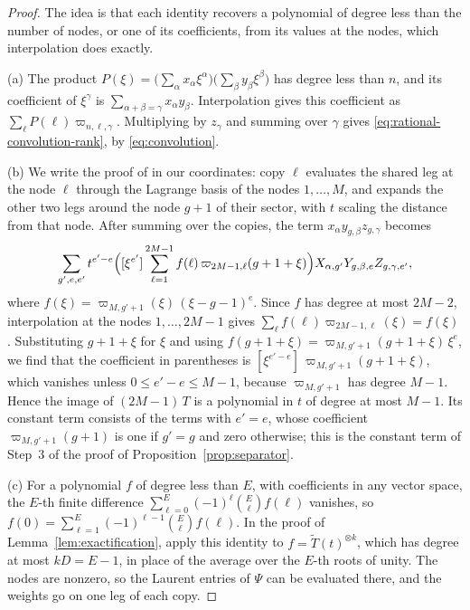 \begin{proof}
The idea is that each identity recovers a polynomial of degree less
than the number of nodes, or one of its coefficients, from its values at
the nodes, which interpolation does exactly.

(a) The product
\(P(\xi)=\bigl(\sum_\alpha x_\alpha\xi^\alpha\bigr)
\bigl(\sum_\beta y_\beta\xi^\beta\bigr)\) has degree less than \(n\),
and its coefficient of \(\xi^\gamma\) is
\(\sum_{\alpha+\beta=\gamma}x_\alpha y_\beta\). Interpolation gives this
coefficient as \(\sum_\ell P(\ell)\varpi_{n,\ell,\gamma}\). Multiplying by
\(z_\gamma\) and summing over \(\gamma\) gives
\eqref{eq:rational-convolution-rank}, by \eqref{eq:convolution}.

(b) We write the proof of \citet{Lu26} in our coordinates: copy
\(\ell\) evaluates the shared leg at the node \(\ell\) through the
Lagrange basis of the nodes \(1,\ldots,M\), and expands the other two
legs around the node \(g+1\) of their sector, with \(t\) scaling the
distance from that node. After summing over the copies, the term
\(x_\alpha y_{g,\beta}z_{g,\gamma}\) becomes
\[
 \sum_{g',e,e'}t^{e'-e}\Bigl([\xi^{e'}]\sum_{\ell=1}^{2M-1}f(\ell)\,
 \varpi_{2M-1,\ell}(g+1+\xi)\Bigr)X_{\alpha,g'}Y_{g,\beta,e}Z_{g,\gamma,e'},
\]
where \(f(\xi)=\varpi_{M,g'+1}(\xi)\,(\xi-g-1)^e\). Since \(f\) has
degree at most \(2M-2\), interpolation at the nodes \(1,\ldots,2M-1\)
gives \(\sum_\ell f(\ell)\varpi_{2M-1,\ell}(\xi)=f(\xi)\). Substituting
\(g+1+\xi\) for \(\xi\) and using
\(f(g+1+\xi)=\varpi_{M,g'+1}(g+1+\xi)\,\xi^e\), we find that the
coefficient in parentheses is \([\xi^{e'-e}]\,\varpi_{M,g'+1}(g+1+\xi)\),
which vanishes unless \(0\le e'-e\le M-1\), because \(\varpi_{M,g'+1}\)
has degree \(M-1\). Hence the image of \((2M-1)\,T\) is a polynomial in
\(t\) of degree at most \(M-1\). Its constant term consists of the terms
with \(e'=e\), whose coefficient \(\varpi_{M,g'+1}(g+1)\) is one if
\(g'=g\) and zero otherwise; this is the constant term of Step~3 of the
proof of Proposition~\ref{prop:separator}.

(c) For a polynomial \(f\) of degree less than \(E\), with coefficients
in any vector space, the \(E\)-th finite difference
\(\sum_{\ell=0}^E(-1)^\ell\binom E\ell f(\ell)\) vanishes, so
\(f(0)=\sum_{\ell=1}^E(-1)^{\ell-1}\binom E\ell f(\ell)\). In the proof of
Lemma~\ref{lem:exactification}, apply this identity to
\(f=\widetilde T(t)^{\otimes k}\), which has degree at most \(kD=E-1\),
in place of the average over the \(E\)-th roots of unity. The nodes are
nonzero, so the Laurent entries of \(\Psi\) can be evaluated there, and
the weights go on one leg of each copy.
\end{proof}

